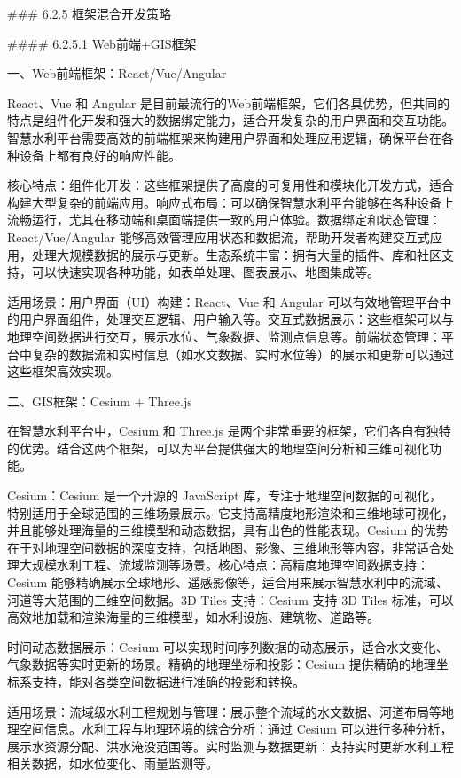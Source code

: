 \#\#\# 6.2.5 框架混合开发策略

\#\#\#\# 6.2.5.1 Web前端+GIS框架

一、Web前端框架：React/Vue/Angular

React、Vue 和 Angular 是目前最流行的Web前端框架，它们各具优势，但共同的特点是组件化开发和强大的数据绑定能力，适合开发复杂的用户界面和交互功能。智慧水利平台需要高效的前端框架来构建用户界面和处理应用逻辑，确保平台在各种设备上都有良好的响应性能。

核心特点：组件化开发：这些框架提供了高度的可复用性和模块化开发方式，适合构建大型复杂的前端应用。响应式布局：可以确保智慧水利平台能够在各种设备上流畅运行，尤其在移动端和桌面端提供一致的用户体验。数据绑定和状态管理：React/Vue/Angular 能够高效管理应用状态和数据流，帮助开发者构建交互式应用，处理大规模数据的展示与更新。生态系统丰富：拥有大量的插件、库和社区支持，可以快速实现各种功能，如表单处理、图表展示、地图集成等。

适用场景：用户界面（UI）构建：React、Vue 和 Angular 可以有效地管理平台中的用户界面组件，处理交互逻辑、用户输入等。交互式数据展示：这些框架可以与地理空间数据进行交互，展示水位、气象数据、监测点信息等。前端状态管理：平台中复杂的数据流和实时信息（如水文数据、实时水位等）的展示和更新可以通过这些框架高效实现。

二、GIS框架：Cesium + Three.js

在智慧水利平台中，Cesium 和 Three.js 是两个非常重要的框架，它们各自有独特的优势。结合这两个框架，可以为平台提供强大的地理空间分析和三维可视化功能。

Cesium：Cesium 是一个开源的 JavaScript 库，专注于地理空间数据的可视化，特别适用于全球范围的三维场景展示。它支持高精度地形渲染和三维地球可视化，并且能够处理海量的三维模型和动态数据，具有出色的性能表现。Cesium 的优势在于对地理空间数据的深度支持，包括地图、影像、三维地形等内容，非常适合处理大规模水利工程、流域监测等场景。核心特点：高精度地理空间数据支持：Cesium 能够精确展示全球地形、遥感影像等，适合用来展示智慧水利中的流域、河道等大范围的三维空间数据。3D Tiles 支持：Cesium 支持 3D Tiles 标准，可以高效地加载和渲染海量的三维模型，如水利设施、建筑物、道路等。

时间动态数据展示：Cesium 可以实现时间序列数据的动态展示，适合水文变化、气象数据等实时更新的场景。精确的地理坐标和投影：Cesium 提供精确的地理坐标系支持，能对各类空间数据进行准确的投影和转换。

适用场景：流域级水利工程规划与管理：展示整个流域的水文数据、河道布局等地理空间信息。水利工程与地理环境的综合分析：通过 Cesium 可以进行多种分析，展示水资源分配、洪水淹没范围等。实时监测与数据更新：支持实时更新水利工程相关数据，如水位变化、雨量监测等。

